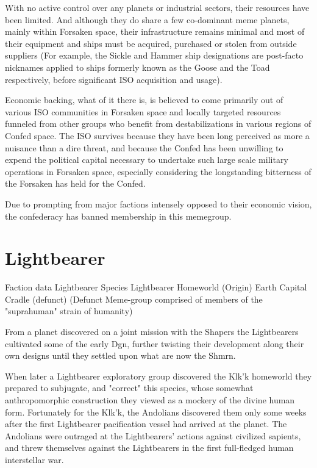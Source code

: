 With no active control over any planets or industrial sectors, their
resources have been limited. And although they do share a few
co-dominant meme planets, mainly within Forsaken space, their
infrastructure remains minimal and most of their equipment and ships
must be acquired, purchased or stolen from outside suppliers (For
example, the Sickle and Hammer ship designations are post-facto
nicknames applied to ships formerly known as the Goose and the Toad
respectively, before significant ISO acquisition and usage).

Economic backing, what of it there is, is believed to come primarily
out of various ISO communities in Forsaken space and locally targeted
resources funneled from other groups who benefit from destabilizations
in various regions of Confed space. The ISO survives because they have
been long perceived as more a nuisance than a dire threat, and because
the Confed has been unwilling to expend the political capital
necessary to undertake such large scale military operations in
Forsaken space, especially considering the longstanding bitterness of
the Forsaken has held for the Confed.

Due to prompting from major factions intensely opposed to their
economic vision, the confederacy has banned membership in this
memegroup.
 
\section{Lightbearer}

Faction data 
Lightbearer 
Species 	Lightbearer 
Homeworld (Origin) 	Earth 
Capital 	Cradle (defunct)
(Defunct Meme-group comprised of members of the "suprahuman" strain of humanity) 

From a planet discovered on a joint mission with the Shapers the
Lightbearers cultivated some of the early Dgn, further twisting their
development along their own designs until they settled upon what are
now the Shmrn.

When later a Lightbearer exploratory group discovered the Klk'k
homeworld they prepared to subjugate, and "correct" this species,
whose somewhat anthropomorphic construction they viewed as a mockery
of the divine human form. Fortunately for the Klk'k, the Andolians
discovered them only some weeks after the first Lightbearer
pacification vessel had arrived at the planet. The Andolians were
outraged at the Lightbearers' actions against civilized sapients, and
threw themselves against the Lightbearers in the first full-fledged
human interstellar war.

